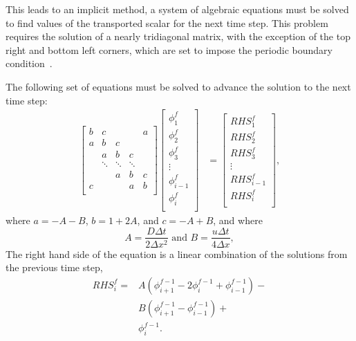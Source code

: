 \documentclass[twocolumn,10pt]{asme2ej}
\begin{document}
\noindent This leads to an implicit method, a system of algebraic equations must be solved to find values of the transported scalar for the next time step. This problem requires the solution of a nearly tridiagonal matrix, with the exception of the top right and bottom left corners, which are set to impose the periodic boundary condition~\cite{hogarth1990comparative}.

The following set of equations must be solved to advance the solution to the next time step:
\begin{equation}
\begin{split}
\begin{bmatrix}
   { b } & { c } & {   }  & {   }  & { a } \\
   { a } & { b } & { c }  & {   }  & {   } \\
   {   } & { a } & { b }  & { c }  & {   } \\
   {   } & \ddots & \ddots & \ddots & {  } \\
   {   } & {   } & { a }  & { b } & { c } \\
   { c } & {   } & {   }  & { a }  & { b } \\
\end{bmatrix}
\begin{bmatrix}
   {\phi_1^{f} }   \\
   {\phi_2^{f} }   \\
   {\phi_3^{f} }   \\
   \vdots   \\
   {\phi_{i-1}^{f} } \\
   {\phi_{i}^{f} } \\
\end{bmatrix}
& =
\begin{bmatrix}
   {RHS_1^{f} }   \\
   {RHS_2^{f} }   \\
   {RHS_3^{f} }   \\
   \vdots   \\
   {RHS_{i-1}^{f} } \\
   {RHS_{i}^{f} } \\
\end{bmatrix},
\end{split}
\end{equation}
where $a = -A - B$, $b = 1 + 2 A $, and $c = -A + B$, and where
\begin{equation}
A = \frac{D \Delta t }{2 \Delta x^2} \mbox{ and } B = \frac{u \Delta t }{4 \Delta x},
\end{equation}
\noindent The right hand side of the equation is a linear combination of the solutions from the previous time step,
\begin{equation}
\begin{split}
RHS_i^f = & A (\phi_{i+1}^{f-1} - 2 \phi_i^{f-1} + \phi_{i-1}^{f-1}) - \\
        & B (\phi_{i+1}^{f-1} - \phi_{i-1}^{f-1}) + \\
        & \phi_i^{f-1}.
\end{split}
\end{equation}
\end{document}
